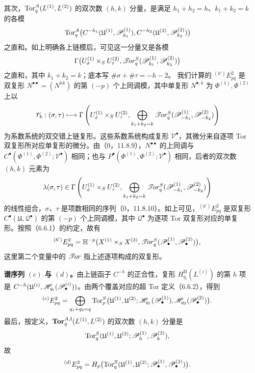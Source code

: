 其次，$\operatorname{Tor}^A_q(L^{(1)},L^{(2)})$ 的双次数 $(h,k)$ 分量，是满足
$h_1+h_2=h$、$k_1+k_2=k$ 的各模
\[
 \operatorname{Tor}^A_q\bigl(C^{-h_1}(\mathfrak U^{(1)},\mathscr P^{(1)}_{k_1}),
                 C^{-h_2}(\mathfrak U^{(2)},\mathscr P^{(2)}_{k_2})\bigr)
\]
之直和。如上明确各上链模后，可见这一分量又是各模
\[
 \Gamma\bigl(U^{(1)}_\sigma\times_SU^{(2)}_\tau,
             \mathscr{T}\!or^S_q(\mathscr P^{(1)}_{k_1},\mathscr P^{(2)}_{k_2})\bigr)
\]
之直和，其中 $k_1+k_2=k$；底本写 $\#\sigma+\#\tau=-h-2$。
我们计算的 ${}^{(b')}E^2_{pq}$ 是双复形 $N^{\bullet\bullet}=(N^{hk})$ 的第 $(-p)$ 个上同调模，其中单复形 $N^{\bullet,k}$ 为 $\Phi^{(1)},\Phi^{(2)}$ 上以
\[
 \mathscr V_k:(\sigma,\tau)\longmapsto
 \Gamma\left(U^{(1)}_\sigma\times_SU^{(2)}_\tau,
       \bigoplus_{k_1+k_2=k}\mathscr{T}\!or^S_q
                (\mathscr P^{(1)}_{-k_1},\mathscr P^{(2)}_{-k_2})\right)
\]
为系数系统的双交错上链复形。这些系数系统构成复形 $\mathscr V^\bullet$，其微分来自逐项 Tor 双复形所对应单复形的微分。由（0，11.8.9），$N^{\bullet\bullet}$ 的上同调与
$C^\bullet(\Phi^{(1)},\Phi^{(2)};\mathscr V^\bullet)$ 相同；也与
$P^\bullet(\Phi^{(1)},\Phi^{(2)};\mathscr V^\bullet)$ 相同，后者的双次数 $(h,k)$ 元素为
\[
 \lambda(\sigma,\tau)\in
 \Gamma\left(U^{(1)}_\sigma\times_SU^{(2)}_\tau,
       \bigoplus_{k_1+k_2=k}\mathscr{T}\!or^S_q
                (\mathscr P^{(1)}_{-k_1},\mathscr P^{(2)}_{-k_2})\right)
\]
的线性组合，$\sigma$、$\tau$ 是项数相同的序列（0，11.8.10）。如上可见，${}^{(b')}E^2_{pq}$ 是双复形 $C^\bullet(\mathfrak U,\mathscr Q^\bullet)$ 的第 $(-p)$ 个上同调模，其中 $\mathscr Q^\bullet$ 为逐项 Tor 双复形对应的单复形。按照（6.6.1）的约定，故有
\[
 {}^{(b')}E^2_{pq}=\mathbb H^{-p}\bigl(X^{(1)}\times_SX^{(2)},
                    \mathscr{T}\!or^S_q(\mathscr P^{(1)}_\bullet,\mathscr P^{(2)}_\bullet)\bigr),
\]
这里第二个变量中的 $\mathscr{T}\!or$ 指上述逐项构成的双复形。

\textbf{谱序列 $(c)$ 与 $(d)$。}由上链函子 $C^{-h}$ 的正合性，复形
$H^{\mathrm{II}}_{q_i}(L^{(i)})$ 的第 $h$ 项是
$C^{-h}(\mathfrak U^{(i)},\mathscr H_{q_i}(\mathscr P^{(i)}_\bullet))$。由两个覆盖对应的超 Tor 定义（6.6.2），得到
\[
 {}^{(c)}E^2_{pq}=\bigoplus_{q_1+q_2=q}
 \operatorname{Tor}^S_p\bigl(\mathfrak U^{(1)},\mathfrak U^{(2)};
       \mathscr H_{q_1}(\mathscr P^{(1)}_\bullet),\mathscr H_{q_2}(\mathscr P^{(2)}_\bullet)\bigr).
\]
最后，按定义，$\operatorname{\mathbf{Tor}}^{A,\mathrm I}_q(L^{(1)},L^{(2)})$ 的双次数 $(h,k)$ 分量是
\[
 \operatorname{Tor}^S_q(\mathfrak U^{(1)},\mathfrak U^{(2)};\mathscr P^{(1)}_h,\mathscr P^{(2)}_k),
\]
故
\[
 {}^{(d)}E^2_{pq}=H_p\bigl(\operatorname{Tor}^S_q(\mathfrak U^{(1)},\mathfrak U^{(2)};
                    \mathscr P^{(1)}_\bullet,\mathscr P^{(2)}_\bullet)\bigr).
\]

